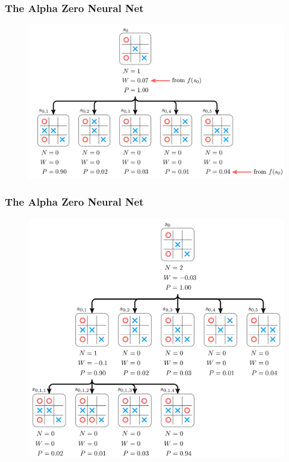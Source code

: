 \documentclass[notheorems, aspectratio=54]{beamer}
\begin{document}
\begin{frame}
    \frametitle{The Alpha Zero Neural Net}

    \begin{figure}
        \includegraphics[width=\textwidth]{fig/alphagozero_mcts1.png}
    \end{figure}
\end{frame}

\begin{frame}
    \frametitle{The Alpha Zero Neural Net}

    \begin{figure}
        \includegraphics[height=0.85\textheight]{fig/alphagozero_mcts2.png}
    \end{figure}
\end{frame}
\end{document}
